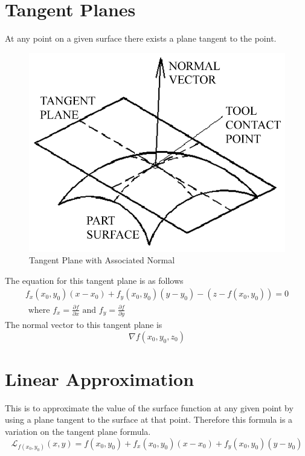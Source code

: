 \documentclass{article}
\begin{document}
\section{Tangent Planes}
At any point on a given surface there exists a plane tangent to the point.
\begin{figure}
\centering
    \includegraphics[scale=0.75]{tplane.png}
    \caption{Tangent Plane with Associated Normal}
\end{figure}
The equation for this tangent plane is as follows
\begin{equation}
\begin{aligned}
f_x(x_0, y_0)(x - x_0) + f_y(x_0, y_0)(y - y_0) - (z - f(x_0, y_0)) = 0\\
\text{ where } f_x = \frac{\partial f}{\partial x} \text{ and } f_y = \frac{\partial f}{\partial y}
\end{aligned}
\end{equation}
The normal vector to this tangent plane is
\begin{equation}
\nabla f(x_0, y_0, z_0)
\end{equation}
\section{Linear Approximation}
This is to approximate the value of the surface function at any given point by using a plane tangent to the surface at that point. Therefore this formula is a variation on the tangent plane formula.
\begin{equation}
\mathcal{L}_{f(x_0, y_0)}(x, y) = f(x_0, y_0) + f_x(x_0, y_0)(x - x_0) + f_y(x_0, y_0)(y - y_0)
\end{equation}
\end{document}
